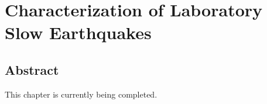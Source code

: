 \chapter{Characterization of Laboratory Slow Earthquakes}

\section{Abstract}
This chapter is currently being completed.